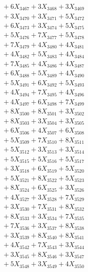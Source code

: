 \documentclass[a4paper,10pt]{article}
\begin{document}
{\begin{align}
&\;  + 6 X_{3467} + 3 X_{3468} + 3 X_{3469} \\[0.3ex]
&\;  + 3 X_{3470} + 3 X_{3471} + 5 X_{3472} \\[0.3ex]
&\;  + 6 X_{3473} + 3 X_{3474} + 5 X_{3475} \\[0.3ex]
&\;  + 5 X_{3476} + 7 X_{3477} + 5 X_{3478} \\[0.3ex]
&\;  + 7 X_{3479} + 4 X_{3480} + 4 X_{3481} \\[0.3ex]
&\;  + 4 X_{3482} + 5 X_{3483} + 4 X_{3484} \\[0.3ex]
&\;  + 7 X_{3485} + 4 X_{3486} + 4 X_{3487} \\[0.3ex]
&\;  + 6 X_{3488} + 5 X_{3489} + 4 X_{3490} \\[0.5ex]\allowbreak
&\;  + 5 X_{3491} + 6 X_{3492} + 5 X_{3493} \\[0.3ex]
&\;  + 4 X_{3494} + 7 X_{3495} + 4 X_{3496} \\[0.3ex]
&\;  + 4 X_{3497} + 6 X_{3498} + 7 X_{3499} \\[0.3ex]
&\;  + 8 X_{3500} + 8 X_{3501} + 3 X_{3502} \\[0.3ex]
&\;  + 8 X_{3503} + 3 X_{3504} + 3 X_{3505} \\[0.3ex]
&\;  + 6 X_{3506} + 4 X_{3507} + 6 X_{3508} \\[0.3ex]
&\;  + 5 X_{3509} + 7 X_{3510} + 8 X_{3511} \\[0.3ex]
&\;  + 5 X_{3512} + 3 X_{3513} + 3 X_{3514} \\[0.3ex]
&\;  + 5 X_{3515} + 5 X_{3516} + 5 X_{3517} \\[0.3ex]
&\;  + 3 X_{3518} + 6 X_{3519} + 5 X_{3520} \\[0.5ex]\allowbreak
&\;  + 5 X_{3521} + 8 X_{3522} + 5 X_{3523} \\[0.3ex]
&\;  + 8 X_{3524} + 6 X_{3525} + 3 X_{3526} \\[0.3ex]
&\;  + 4 X_{3527} + 3 X_{3528} + 7 X_{3529} \\[0.3ex]
&\;  + 3 X_{3530} + 7 X_{3531} + 8 X_{3532} \\[0.3ex]
&\;  + 8 X_{3533} + 3 X_{3534} + 7 X_{3535} \\[0.3ex]
&\;  + 7 X_{3536} + 3 X_{3537} + 8 X_{3538} \\[0.3ex]
&\;  + 3 X_{3539} + 8 X_{3540} + 8 X_{3541} \\[0.3ex]
&\;  + 4 X_{3542} + 7 X_{3543} + 3 X_{3544} \\[0.3ex]
&\;  + 3 X_{3545} + 8 X_{3546} + 3 X_{3547} \\[0.3ex]
&\;  + 5 X_{3548} + 3 X_{3549} + 4 X_{3550} \\[0.5ex]\allowbreak

\end{align}}
\end{document}
